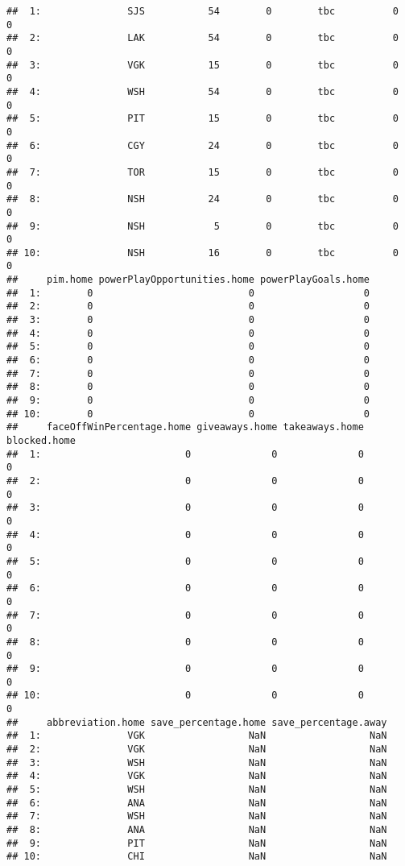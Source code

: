 \documentclass[
]{article}
\begin{document}
\begin{verbatim}
##  1:               SJS           54        0        tbc          0         0
##  2:               LAK           54        0        tbc          0         0
##  3:               VGK           15        0        tbc          0         0
##  4:               WSH           54        0        tbc          0         0
##  5:               PIT           15        0        tbc          0         0
##  6:               CGY           24        0        tbc          0         0
##  7:               TOR           15        0        tbc          0         0
##  8:               NSH           24        0        tbc          0         0
##  9:               NSH            5        0        tbc          0         0
## 10:               NSH           16        0        tbc          0         0
##     pim.home powerPlayOpportunities.home powerPlayGoals.home
##  1:        0                           0                   0
##  2:        0                           0                   0
##  3:        0                           0                   0
##  4:        0                           0                   0
##  5:        0                           0                   0
##  6:        0                           0                   0
##  7:        0                           0                   0
##  8:        0                           0                   0
##  9:        0                           0                   0
## 10:        0                           0                   0
##     faceOffWinPercentage.home giveaways.home takeaways.home blocked.home
##  1:                         0              0              0            0
##  2:                         0              0              0            0
##  3:                         0              0              0            0
##  4:                         0              0              0            0
##  5:                         0              0              0            0
##  6:                         0              0              0            0
##  7:                         0              0              0            0
##  8:                         0              0              0            0
##  9:                         0              0              0            0
## 10:                         0              0              0            0
##     abbreviation.home save_percentage.home save_percentage.away
##  1:               VGK                  NaN                  NaN
##  2:               VGK                  NaN                  NaN
##  3:               WSH                  NaN                  NaN
##  4:               VGK                  NaN                  NaN
##  5:               WSH                  NaN                  NaN
##  6:               ANA                  NaN                  NaN
##  7:               WSH                  NaN                  NaN
##  8:               ANA                  NaN                  NaN
##  9:               PIT                  NaN                  NaN
## 10:               CHI                  NaN                  NaN
\end{verbatim}
\end{document}
